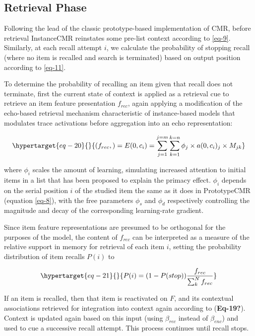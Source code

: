 \documentclass[
  letterpaper,
]{article}
\begin{document}
\hypertarget{retrieval-phase-1}{%
\subsection{Retrieval Phase}\label{retrieval-phase-1}}

Following the lead of the classic prototype-based implementation of CMR,
before retrieval InstanceCMR reinstates some pre-list context according
to \ref{eq-9}. Similarly, at each recall attempt \(i\), we calculate the
probability of stopping recall (where no item is recalled and search is
terminated) based on output position according to \ref{eq-11}.

To determine the probability of recalling an item given that recall does
not terminate, first the current state of context is applied as a
retrieval cue to retrieve an item feature presentation \(f_{rec}\),
again applying a modification of the echo-based retrieval mechanism
characteristic of instance-based models that modulates trace activations
before aggregation into an echo representation:

\begin{equation}\protect\hypertarget{eq-20}{}{
(f_{rec},) = E(0, c_i) = \sum^{j=m}_{j=1}\sum^{k=n}_{k=1} {\phi}_j \times a(0, c_i)_j \times M_{jk}
}\label{eq-20}\end{equation}

where \({\phi}_i\) scales the amount of learning, simulating increased
attention to initial items in a list that has been proposed to explain
the primacy effect. \({\phi}_i\) depends on the serial position \(i\) of
the studied item the same as it does in PrototypeCMR (equation
\ref{eq-8}), with the free parameters \({\phi}_s\) and \({\phi}_d\)
respectively controlling the magnitude and decay of the corresponding
learning-rate gradient.

Since item feature representations are presumed to be orthogonal for the
purposes of the model, the content of \(f_{rec}\) can be interpreted as
a measure of the relative support in memory for retrieval of each item
\(i\), setting the probability distribution of item recalls \(P(i)\) to

\begin{equation}\protect\hypertarget{eq-21}{}{
P(i) = (1-P(stop))\frac{f_{rec}}{\sum_{k}^{N}f_{rec}}
}\label{eq-21}\end{equation}

If an item is recalled, then that item is reactivated on \(F\), and its
contextual associations retrieved for integration into context again
according to (\textbf{Eq-19?}). Context is updated again based on this
input (using \(\beta_{rec}\) instead of \(\beta_{enc}\)) and used to cue
a successive recall attempt. This process continues until recall stops.
\end{document}
